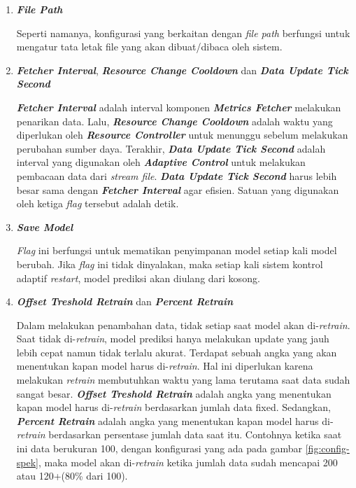 \begin{enumerate}
    \item \textbf{\textit{File Path}}
    
    Seperti namanya, konfigurasi yang berkaitan dengan \textit{file path} berfungsi untuk mengatur tata letak file yang akan dibuat/dibaca oleh sistem.

    \item \textbf{\textit{Fetcher Interval}}, \textbf{\textit{Resource Change Cooldown}} dan \textbf{\textit{Data Update Tick Second}}
    
    \textbf{\textit{Fetcher Interval}} adalah interval komponen \textbf{\textit{Metrics Fetcher}} melakukan penarikan data. Lalu, \textbf{\textit{Resource Change Cooldown}} adalah waktu yang diperlukan oleh \textbf{\textit{Resource Controller}} untuk menunggu sebelum melakukan perubahan sumber daya. Terakhir, \textbf{\textit{Data Update Tick Second}} adalah interval yang digunakan oleh \textbf{\textit{Adaptive Control}} untuk melakukan pembacaan data dari \textit{stream file}. \textbf{\textit{Data Update Tick Second}} harus lebih besar sama dengan \textbf{\textit{Fetcher Interval}} agar efisien. Satuan yang digunakan oleh ketiga \textit{flag} tersebut adalah detik.

    \item \textbf{\textit{Save Model}}
    
    \textit{Flag} ini berfungsi untuk mematikan penyimpanan model setiap kali model berubah. Jika \textit{flag} ini tidak dinyalakan, maka setiap kali sistem kontrol adaptif \textit{restart}, model prediksi akan diulang dari kosong.

    \item \textbf{\textit{Offset Treshold Retrain}} dan \textbf{\textit{Percent Retrain}}
    
    Dalam melakukan penambahan data, tidak setiap saat model akan di-\textit{retrain}. Saat tidak di-\textit{retrain}, model prediksi hanya melakukan update yang jauh lebih cepat namun tidak terlalu akurat. Terdapat sebuah angka yang akan menentukan kapan model harus di-\textit{retrain}. Hal ini diperlukan karena melakukan \textit{retrain} membutuhkan waktu yang lama terutama saat data sudah sangat besar. \textbf{\textit{Offset Treshold Retrain}} adalah angka yang menentukan kapan model harus di-\textit{retrain} berdasarkan jumlah data fixed. Sedangkan, \textbf{\textit{Percent Retrain}} adalah angka yang menentukan kapan model harus di-\textit{retrain} berdasarkan persentase jumlah data saat itu. Contohnya ketika saat ini data berukuran 100, dengan konfigurasi yang ada pada gambar \ref{fig:config-spek}, maka model akan di-\textit{retrain} ketika jumlah data sudah mencapai 200 atau 120+(80\% dari 100).
\end{enumerate}

